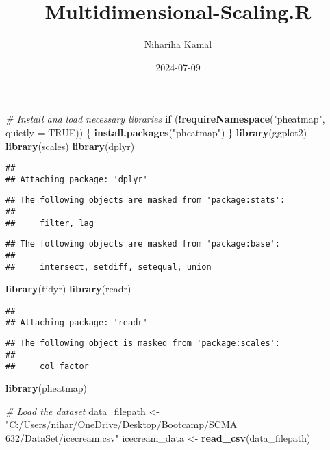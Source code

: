 \documentclass[
]{article}
\title{Multidimensional-Scaling.R}
\author{Nihariha Kamal}
\date{2024-07-09}
\newenvironment{Shaded}{\begin{snugshade}}{\end{snugshade}}
\newcommand{\AttributeTok}[1]{\textcolor[rgb]{0.13,0.29,0.53}{#1}}
\newcommand{\CommentTok}[1]{\textcolor[rgb]{0.56,0.35,0.01}{\textit{#1}}}
\newcommand{\ConstantTok}[1]{\textcolor[rgb]{0.56,0.35,0.01}{#1}}
\newcommand{\ControlFlowTok}[1]{\textcolor[rgb]{0.13,0.29,0.53}{\textbf{#1}}}
\newcommand{\FunctionTok}[1]{\textcolor[rgb]{0.13,0.29,0.53}{\textbf{#1}}}
\newcommand{\NormalTok}[1]{#1}
\newcommand{\OtherTok}[1]{\textcolor[rgb]{0.56,0.35,0.01}{#1}}
\newcommand{\SpecialCharTok}[1]{\textcolor[rgb]{0.81,0.36,0.00}{\textbf{#1}}}
\newcommand{\StringTok}[1]{\textcolor[rgb]{0.31,0.60,0.02}{#1}}
\begin{document}
\maketitle

\begin{Shaded}
\begin{Highlighting}[]
\CommentTok{\# Install and load necessary libraries}
\ControlFlowTok{if}\NormalTok{ (}\SpecialCharTok{!}\FunctionTok{requireNamespace}\NormalTok{(}\StringTok{"pheatmap"}\NormalTok{, }\AttributeTok{quietly =} \ConstantTok{TRUE}\NormalTok{)) \{}
  \FunctionTok{install.packages}\NormalTok{(}\StringTok{"pheatmap"}\NormalTok{)}
\NormalTok{\}}
\FunctionTok{library}\NormalTok{(ggplot2)}
\FunctionTok{library}\NormalTok{(scales)}
\FunctionTok{library}\NormalTok{(dplyr)}
\end{Highlighting}
\end{Shaded}

\begin{verbatim}
## 
## Attaching package: 'dplyr'
\end{verbatim}

\begin{verbatim}
## The following objects are masked from 'package:stats':
## 
##     filter, lag
\end{verbatim}

\begin{verbatim}
## The following objects are masked from 'package:base':
## 
##     intersect, setdiff, setequal, union
\end{verbatim}

\begin{Shaded}
\begin{Highlighting}[]
\FunctionTok{library}\NormalTok{(tidyr)}
\FunctionTok{library}\NormalTok{(readr)}
\end{Highlighting}
\end{Shaded}

\begin{verbatim}
## 
## Attaching package: 'readr'
\end{verbatim}

\begin{verbatim}
## The following object is masked from 'package:scales':
## 
##     col_factor
\end{verbatim}

\begin{Shaded}
\begin{Highlighting}[]
\FunctionTok{library}\NormalTok{(pheatmap)}

\CommentTok{\# Load the dataset}
\NormalTok{data\_filepath }\OtherTok{\textless{}{-}} \StringTok{"C:/Users/nihar/OneDrive/Desktop/Bootcamp/SCMA 632/DataSet/icecream.csv"}
\NormalTok{icecream\_data }\OtherTok{\textless{}{-}} \FunctionTok{read\_csv}\NormalTok{(data\_filepath)}
\end{Highlighting}
\end{Shaded}
\end{document}
